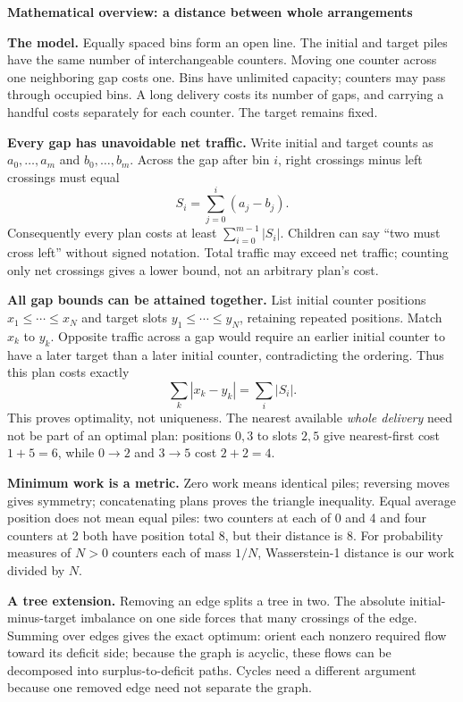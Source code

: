 \documentclass[11pt]{article}
\newcommand{\head}[1]{\par\textbf{\large #1}\par}
\begin{document}
\head{Mathematical overview: a distance between whole arrangements}
\textbf{The model.} Equally spaced bins form an open line. The initial and target piles have the same number of interchangeable counters. Moving one counter across one neighboring gap costs one. Bins have unlimited capacity; counters may pass through occupied bins. A long delivery costs its number of gaps, and carrying a handful costs separately for each counter. The target remains fixed.

\textbf{Every gap has unavoidable net traffic.} Write initial and target counts as $a_0,\ldots,a_m$ and $b_0,\ldots,b_m$. Across the gap after bin $i$, right crossings minus left crossings must equal
\[
S_i=\sum_{j=0}^{i}(a_j-b_j).
\]
Consequently every plan costs at least $\sum_{i=0}^{m-1}|S_i|$. Children can say ``two must cross left'' without signed notation. Total traffic may exceed net traffic; counting only net crossings gives a lower bound, not an arbitrary plan's cost.

\textbf{All gap bounds can be attained together.} List initial counter positions $x_1\le\cdots\le x_N$ and target slots $y_1\le\cdots\le y_N$, retaining repeated positions. Match $x_k$ to $y_k$. Opposite traffic across a gap would require an earlier initial counter to have a later target than a later initial counter, contradicting the ordering. Thus this plan costs exactly
\[
\sum_k|x_k-y_k|=\sum_i|S_i|.
\]
This proves optimality, not uniqueness. The nearest available \emph{whole delivery} need not be part of an optimal plan: positions $0,3$ to slots $2,5$ give nearest-first cost $1+5=6$, while $0\to2$ and $3\to5$ cost $2+2=4$.

\textbf{Minimum work is a metric.} Zero work means identical piles; reversing moves gives symmetry; concatenating plans proves the triangle inequality. Equal average position does not mean equal piles: two counters at each of 0 and 4 and four counters at 2 both have position total 8, but their distance is 8. For probability measures of $N>0$ counters each of mass $1/N$, Wasserstein-1 distance is our work divided by $N$.

\textbf{A tree extension.} Removing an edge splits a tree in two. The absolute initial-minus-target imbalance on one side forces that many crossings of the edge. Summing over edges gives the exact optimum: orient each nonzero required flow toward its deficit side; because the graph is acyclic, these flows can be decomposed into surplus-to-deficit paths. Cycles need a different argument because one removed edge need not separate the graph.
\end{document}

